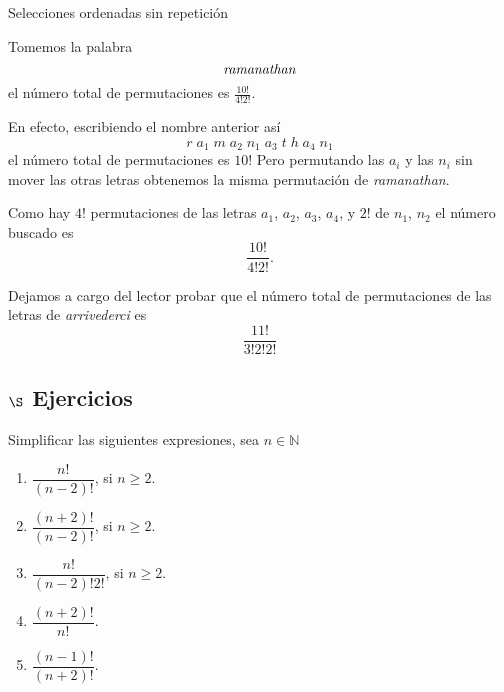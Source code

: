 \begin{section}{Selecciones ordenadas sin repetición}
\begin{ejemplo}
Tomemos la palabra
$$
\text{\em ramanathan}
$$
el número total de permutaciones es $\displaystyle{\frac{10!}{ 4!2!}}$.

En efecto, escribiendo el nombre anterior así 
$$
r\;a_1\;m\;a_2\;n_1\;a_3\;t\;h\;a_4\;n_1
$$
el número total de permutaciones es $10!$ Pero
permutando las $a_i$ y las $n_i$ sin mover las otras letras obtenemos
la misma permutación de {\em ramanathan}.

Como hay $4!$ permutaciones de las letras $a_1$, $a_2$, $a_3$, $a_4$, y
$2!$ de $n_1$, $n_2$ el número buscado es 
$$
\frac{10!}{ 4!2!}.
$$

Dejamos a cargo del lector probar que el número total de
permutaciones de las letras de {\em a\-rri\-ve\-der\-ci} es
$$
\frac{11!}{3!  2!  2!}  
$$
\end{ejemplo}




\subsection*{\Large $\S$ Ejercicios}
	Simplificar las siguientes expresiones, sea $n \in \mathbb N$
	\begin{multicols}{2}
\begin{enumerate}[1)]
	\item $\dfrac{n!}{( n - 2 ) !}$, \qquad si $n \geq 2$.
	
	\item $ \dfrac{(n + 2)!}{( n - 2 ) !}$, \qquad si $n \geq 2$.
	
	\item $\dfrac{n!}{(n-2)! 2!} $, \qquad si $n \geq 2$.
	
	\item $\dfrac{(n + 2)!}{n!}$.
	
	\item $\dfrac{(n-1)!}{(n + 2)!}$.
\end{enumerate}			
	\end{multicols}

\end{section}

